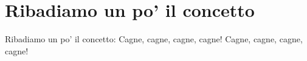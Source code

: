\section{Ribadiamo un po' il concetto}
\subtitle{Usualmente cantato dopo “Youporn”}
\begin{canzone}
Ribadiamo un po' il concetto:
Cagne, cagne, cagne, cagne!
Cagne, cagne, cagne, cagne!
\end{canzone}
